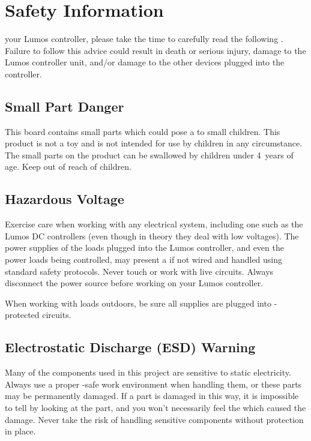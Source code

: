 \documentclass[letterpaper,twoside,onecolumn,openright,final]{memoir}
\begin{document}
\chapter{Safety Information}\label{ch:safety}

 your Lumos controller, please take the time to
carefully read the following .  Failure to follow this advice could
result in death or serious injury, damage to the Lumos controller unit, and/or damage
to the other devices plugged into the controller.

\section{Small Part Danger}
This board contains small parts which could pose a  to small children.
This product is not a toy and is not intended for use by children in any circumstance.
The small parts on the product can be swallowed by children under 4~years of age. Keep
out of reach of children.

\section{Hazardous Voltage}
Exercise care when working with any electrical system, including one such as the Lumos DC
controllers (even though in theory they deal with low voltages).  The power supplies of the
loads plugged into the Lumos controller, and even the power loads being controlled, may present
a  if not wired and handled using standard safety protocols.  Never touch or work
with live circuits. Always disconnect the power source before working on your Lumos controller.

When working with loads outdoors, be sure all supplies are plugged into -protected
circuits.

\section{Electrostatic Discharge (ESD) Warning}
Many of the components used in this project are sensitive to static electricity.  Always use a proper
-safe work environment when handling them, or these parts may be permanently damaged.  If
a part is damaged in this way, 
it is impossible to tell by looking at the part, and you won't necessarily
feel the  which caused the damage.  Never take the risk of handling sensitive components
without  protection in place.
\end{document}
